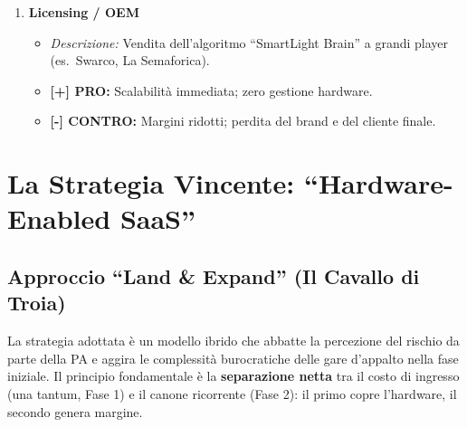 \documentclass[a4paper,11pt]{article}
\newcommand{\pro}[1]{\textcolor{SmartGreen}{\textbf{[+] PRO:} #1}}
\newcommand{\contro}[1]{\textcolor{SmartRed}{\textbf{[-] CONTRO:} #1}}
\begin{document}
\begin{enumerate}[label=\textbf{\arabic*.}, leftmargin=*, itemsep=1em]
    \item \textbf{Licensing / OEM}
    \begin{itemize}[label=, leftmargin=1em, nosep]
        \item \textit{Descrizione:} Vendita dell'algoritmo ``SmartLight Brain'' a grandi player (es.\ Swarco, La Semaforica).
        \item \pro{Scalabilità immediata; zero gestione hardware.}
        \item \contro{Margini ridotti; perdita del brand e del cliente finale.}
    \end{itemize}

\end{enumerate}

\section{La Strategia Vincente: ``Hardware-Enabled SaaS''}

\subsection*{Approccio ``Land \& Expand'' (Il Cavallo di Troia)}

La strategia adottata è un modello ibrido che abbatte la percezione del rischio
da parte della PA e aggira le complessità burocratiche delle gare d'appalto
nella fase iniziale. Il principio fondamentale è la \textbf{separazione netta}
tra il costo di ingresso (una tantum, Fase 1) e il canone ricorrente (Fase 2):
il primo copre l'hardware, il secondo genera margine.
\end{document}
